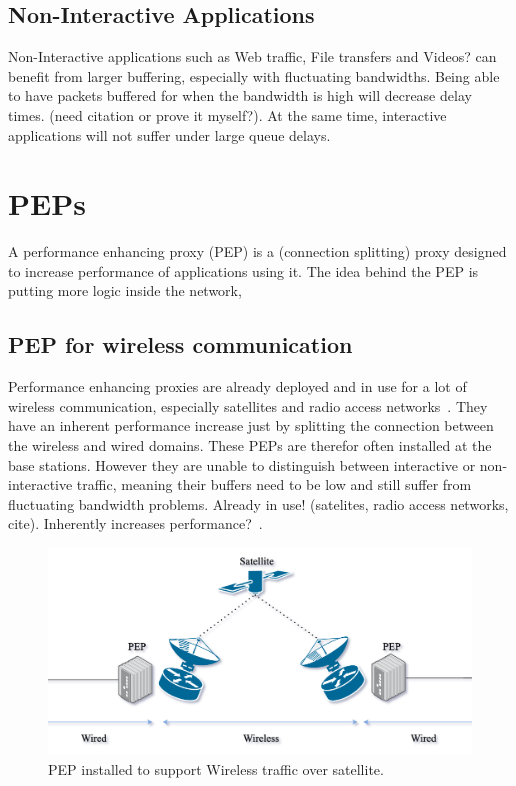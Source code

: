 \documentclass[a4paper,english, 11pt]{report}
\begin{document}
\subsection{Non-Interactive Applications}
Non-Interactive applications such as Web traffic, File transfers and Videos? can benefit from larger buffering, especially with fluctuating bandwidths. Being able to have packets buffered for when the bandwidth is high will decrease delay times. (need citation or prove it myself?). At the same time, interactive applications will not suffer under large queue delays.

\section{PEPs}
A performance enhancing proxy (PEP) is a (connection splitting) proxy designed to increase performance of applications using it. The idea behind the PEP is putting more logic inside the network,

\subsection{PEP for wireless communication}
Performance enhancing proxies are already deployed and in use for a lot of wireless communication, especially satellites and radio access networks~\cite{tcp_mmwave_proxy}. They have an inherent performance increase just by splitting the connection between the wireless and wired domains. These PEPs are therefor often installed at the base stations. However they are unable to distinguish between interactive or non-interactive traffic, meaning their buffers need to be low and still suffer from fluctuating bandwidth problems.
 Already in use! (satelites, radio access networks, cite). Inherently increases performance?~\cite{tcp_mmwave_proxy}.

\begin{figure}[h] %
	\centering
	\includegraphics[scale=0.50]{../diagrams/drawio/pep_satellite.png}
  	\caption{PEP installed to support Wireless traffic over satellite.}
  	\label{fig:blockage}
\end{figure}
\end{document}
